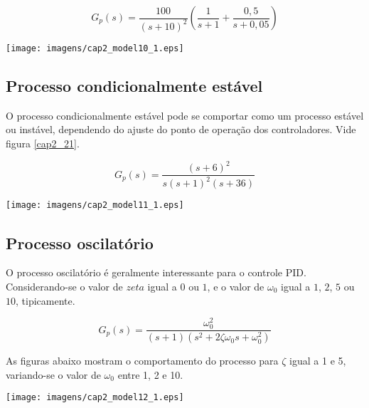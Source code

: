     \begin{equation}
        G_p(s) = \frac{100}{(s+10)^2}\left ( \frac{1}{s+1} + \frac{0,5}{s+0,05} \right )
    \end{equation}
    
    \begin{center}
        \texttt{[image: imagens/cap2\_model10\_1.eps]}
        \label{cap2_20}
    \end{center}

\subsection{Processo condicionalmente estável}
    
    O processo condicionalmente estável pode se comportar como um processo estável
    ou instável, dependendo do ajuste do ponto de operação dos controladores.
    Vide figura \ref{cap2_21}.
    
    \begin{equation}
        G_p(s) = \frac{(s+6)^2}{s(s+1)^2 (s+36)}
    \end{equation}
    
    \begin{center}
        \texttt{[image: imagens/cap2\_model11\_1.eps]}
        \label{cap2_21}
    \end{center}

\subsection{Processo oscilatório}

    O processo oscilatório é geralmente interessante para o controle \acs{PID}.
    Considerando-se o valor de $zeta$ igual a $0$ ou $1$, e o valor de $\omega _0$
    igual a $1$, $2$, $5$ ou $10$, tipicamente.

    \begin{equation}
        G_p(s) = \frac{\omega _0^2}{(s+1)(s^2+2\zeta \omega _0 s+\omega _0^2)}
    \end{equation}
    
    As figuras abaixo mostram o comportamento do processo para $\zeta$
    igual a 1 e 5, variando-se o valor de $\omega _0$ entre 1, 2 e 10.
    
    \begin{center}
        \texttt{[image: imagens/cap2\_model12\_1.eps]}
    \end{center}
    
